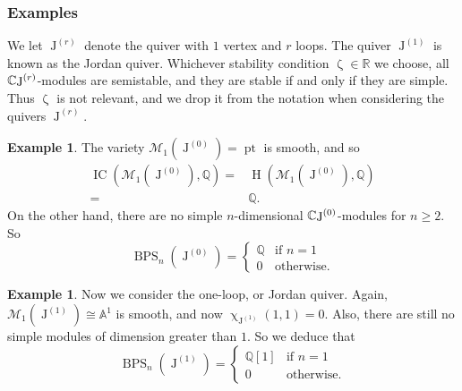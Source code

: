 \documentclass{amsart}
\DeclareMathOperator{\moLQ}{J}
\newcommand{\LQ}[1]{\moLQ^{(#1)}}
\newcommand{\CLQ}[1]{\mathbb{C}\!\moLQ^{(#1)}}
\DeclareMathOperator{\IC}{IC}
\DeclareMathOperator{\pt}{pt}
\newcommand{\Msp}{\mathcal{M}}
\DeclareMathOperator{\HO}{H}
\DeclareMathOperator{\BPS}{BPS}
\def\!{\mskip-\thinmuskip}
\renewcommand{\zeta}{\upzeta}
\renewcommand{\chi}{\upchi}
\theoremstyle{plain}%
\theoremstyle{definition}
\newtheorem{eg}[thm]{Example}
\theoremstyle{remark}
\begin{document}
\subsubsection{Examples}
We let $\LQ{r}$ denote the quiver with $1$ vertex and $r$ loops.  The quiver $\LQ{1}$ is known as the Jordan quiver.  Whichever stability condition $\zeta\in\mathbb{R}$ we choose, all $\CLQ{r}$-modules are semistable, and they are stable if and only if they are simple.  Thus $\zeta$ is not relevant, and we drop it from the notation when considering the quivers $\LQ{r}$.
\begin{eg}\label{coh_ferm}
The variety $\Msp_1(\LQ{0})=\pt$ is smooth, and so 
\begin{align*}
\IC(\Msp_1(\LQ{0}),\mathbb{Q})=&\HO\left(\Msp_1(\LQ{0}),\mathbb{Q}\right)\\
=&\mathbb{Q}.
\end{align*}
On the other hand, there are no simple $n$-dimensional $\CLQ{0}$-modules for $n\geq 2$.  So
\[
\BPS_n(\LQ{0})=\begin{cases} \mathbb{Q} &\textrm{if }n=1\\
0&\textrm{otherwise.}\end{cases}
\]
\end{eg}
\begin{eg}\label{coh_bos}
Now we consider the one-loop, or Jordan quiver.  Again, $\Msp_1(\LQ{1})\cong\mathbb{A}^1$ is smooth, and now $\chi_{\LQ{1}}(1,1)=0$.  Also, there are still no simple modules of dimension greater than $1$.  So we deduce that
\[
\BPS_n(\LQ{1})=\begin{cases} \mathbb{Q}[1] &\textrm{if }n=1\\
0&\textrm{otherwise.}\end{cases}
\]
\end{eg}
\end{document}
